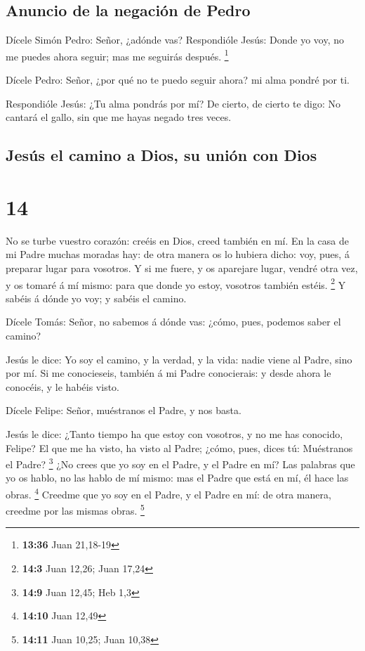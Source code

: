 \hypertarget{anuncio-de-la-negaciuxf3n-de-pedro}{%
\subsection{Anuncio de la negación de
Pedro}\label{anuncio-de-la-negaciuxf3n-de-pedro}}

 Dícele Simón Pedro: Señor, ¿adónde vas? Respondióle
Jesús: Donde yo voy, no me puedes ahora seguir; mas me seguirás después.
\footnote{\textbf{13:36} Juan 21,18-19}

 Dícele Pedro: Señor, ¿por qué no te puedo seguir ahora?
mi alma pondré por ti.

 Respondióle Jesús: ¿Tu alma pondrás por mí? De cierto,
de cierto te digo: No cantará el gallo, sin que me hayas negado tres
veces.

\hypertarget{jesuxfas-el-camino-a-dios-su-uniuxf3n-con-dios}{%
\subsection{Jesús el camino a Dios, su unión con
Dios}\label{jesuxfas-el-camino-a-dios-su-uniuxf3n-con-dios}}

\hypertarget{section-13}{%
\section{14}\label{section-13}}

 No se turbe vuestro corazón: creéis en Dios, creed
también en mí.  En la casa de mi Padre muchas moradas hay:
de otra manera os lo hubiera dicho: voy, pues, á preparar lugar para
vosotros.  Y si me fuere, y os aparejare lugar, vendré
otra vez, y os tomaré á mí mismo: para que donde yo estoy, vosotros
también estéis. \footnote{\textbf{14:3} Juan 12,26; Juan 17,24}
 Y sabéis á dónde yo voy; y sabéis el camino.

 Dícele Tomás: Señor, no sabemos á dónde vas: ¿cómo, pues,
podemos saber el camino?

 Jesús le dice: Yo soy el camino, y la verdad, y la vida:
nadie viene al Padre, sino por mí.  Si me conocieseis,
también á mi Padre conocierais: y desde ahora le conocéis, y le habéis
visto.

 Dícele Felipe: Señor, muéstranos el Padre, y nos basta.

 Jesús le dice: ¿Tanto tiempo ha que estoy con vosotros, y
no me has conocido, Felipe? El que me ha visto, ha visto al Padre;
¿cómo, pues, dices tú: Muéstranos el Padre? \footnote{\textbf{14:9} Juan
  12,45; Heb 1,3}  ¿No crees que yo soy en el Padre, y el
Padre en mí? Las palabras que yo os hablo, no las hablo de mí mismo: mas
el Padre que está en mí, él hace las obras. \footnote{\textbf{14:10}
  Juan 12,49}  Creedme que yo soy en el Padre, y el Padre
en mí: de otra manera, creedme por las mismas obras. \footnote{\textbf{14:11}
  Juan 10,25; Juan 10,38}

